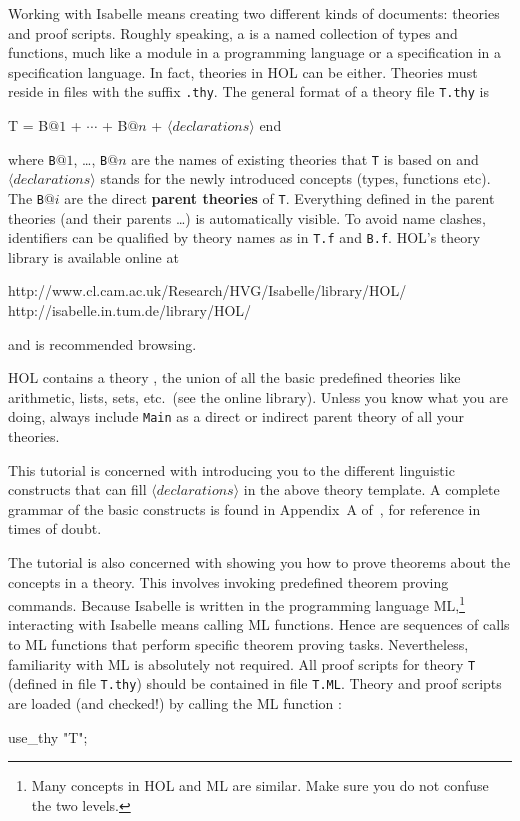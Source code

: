 Working with Isabelle means creating two different kinds of documents:
theories and proof scripts. Roughly speaking, a  is a named
collection of types and functions, much like a module in a programming
language or a specification in a specification language. In fact, theories in
HOL can be either. Theories must reside in files with the suffix
\texttt{.thy}. The general format of a theory file \texttt{T.thy} is
\begin{ttbox}
T = B\(@1\) + \(\cdots\) + B\(@n\) +
\({\langle}declarations{\rangle}\)
end
\end{ttbox}
where \texttt{B}$@1$, \dots, \texttt{B}$@n$ are the names of existing
theories that \texttt{T} is based on and ${\langle}declarations{\rangle}$ stands for the
newly introduced concepts (types, functions etc). The \texttt{B}$@i$ are the
direct \textbf{parent theories} of \texttt{T}.
Everything defined in the parent theories (and their parents \dots) is
automatically visible. To avoid name clashes, identifiers can be qualified by
theory names as in \texttt{T.f} and \texttt{B.f}. HOL's theory library is
available online at
\begin{ttbox}
http://www.cl.cam.ac.uk/Research/HVG/Isabelle/library/HOL/
http://isabelle.in.tum.de/library/HOL/
\end{ttbox}
and is recommended browsing.
\begin{warn}
  HOL contains a theory , the union of all the basic
  predefined theories like arithmetic, lists, sets, etc.\ (see the online
  library).  Unless you know what you are doing, always include \texttt{Main}
  as a direct or indirect parent theory of all your theories.
\end{warn}

This tutorial is concerned with introducing you to the different linguistic
constructs that can fill ${\langle}declarations{\rangle}$ in the above theory template.
A complete grammar of the basic constructs is found in Appendix~A
of~\cite{isabelle-ref}, for reference in times of doubt.

The tutorial is also concerned with showing you how to prove theorems about
the concepts in a theory. This involves invoking predefined theorem proving
commands. Because Isabelle is written in the programming language
ML,\footnote{Many concepts in HOL and ML are similar. Make sure you do not
  confuse the two levels.} interacting with Isabelle means calling ML
functions. Hence  are sequences of calls to ML
functions that perform specific theorem proving tasks. Nevertheless,
familiarity with ML is absolutely not required.  All proof scripts for theory
\texttt{T} (defined in file \texttt{T.thy}) should be contained in file
\texttt{T.ML}. Theory and proof scripts are loaded (and checked!) by calling
the ML function :
\begin{ttbox}
use_thy "T";
\end{ttbox}

